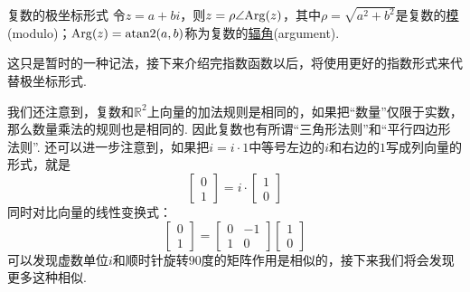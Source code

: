 \documentclass[main.tex]{subfiles}
\begin{document}
\begin{definition}{复数的极坐标形式}
    令\(z=a+bi\)，则\(z=\rho\angle{\rm Arg}(z)\)，其中\(\rho=\sqrt{a^2+b^2}\)是复数的\uline{模}(modulo)；\({\rm Arg}(z) = {\rm atan2}(a,b)\)称为复数的\uline{辐角}(argument).
\end{definition}
这只是暂时的一种记法，接下来介绍完指数函数以后，将使用更好的指数形式来代替极坐标形式.

我们还注意到，复数和\(\mathbb{R}^2\)上向量的加法规则是相同的，如果把“数量”仅限于实数，那么数量乘法的规则也是相同的. 因此复数也有所谓“三角形法则”和“平行四边形法则”. 还可以进一步注意到，如果把\(i=i \cdot 1\)中等号左边的\(i\)和右边的\(1\)写成列向量的形式，就是
\[\begin{bmatrix} 0 \\ 1 \end{bmatrix} = i \cdot \begin{bmatrix} 1 \\ 0 \end{bmatrix}\]
同时对比向量的线性变换式：
\[\begin{bmatrix} 0 \\ 1 \end{bmatrix} =  \begin{bmatrix} 0 & -1 \\1 & 0 \end{bmatrix} \begin{bmatrix} 1 \\ 0 \end{bmatrix}\]
可以发现虚数单位\(i\)和顺时针旋转\(90\)度的矩阵作用是相似的，接下来我们将会发现更多这种相似.
\end{document}
